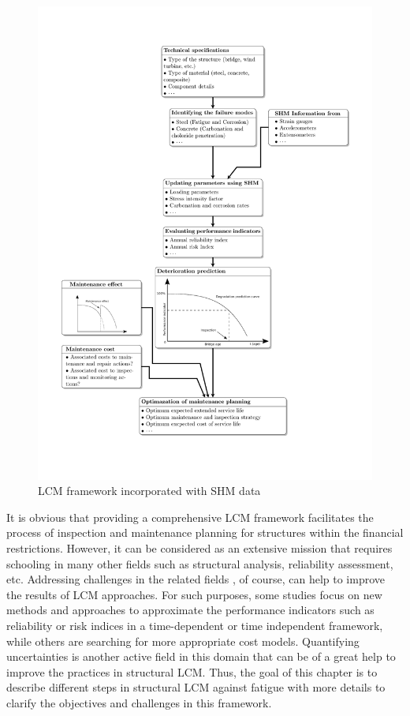 \begin{figure}[hbt!]
\centering
  \includegraphics[trim=1cm 2.5cm 1cm 2cm, clip=true, width=1.05\linewidth]{figures/fig-ch1/maintenance_flow.pdf}
  \caption{LCM framework incorporated with SHM data}
  \label{fig:maintenance_flow}
\end{figure}

It is obvious that providing a comprehensive LCM framework facilitates the process of inspection and maintenance planning for structures within the financial restrictions. However, it
can be considered as an extensive mission that requires schooling in many other fields such as structural analysis, reliability assessment, etc. Addressing challenges in the related 
fields , of course, can help to improve the results of LCM approaches. For such purposes, some studies focus on new methods and approaches to approximate the performance indicators 
such as reliability or risk indices in a time-dependent or time independent framework, while others are searching for more appropriate cost models. Quantifying uncertainties is another 
active field in this domain that can be of a great help to improve the practices in structural LCM. Thus, the goal of this chapter is to describe different steps in structural LCM against 
fatigue with more details to clarify the objectives and challenges in this framework. 

